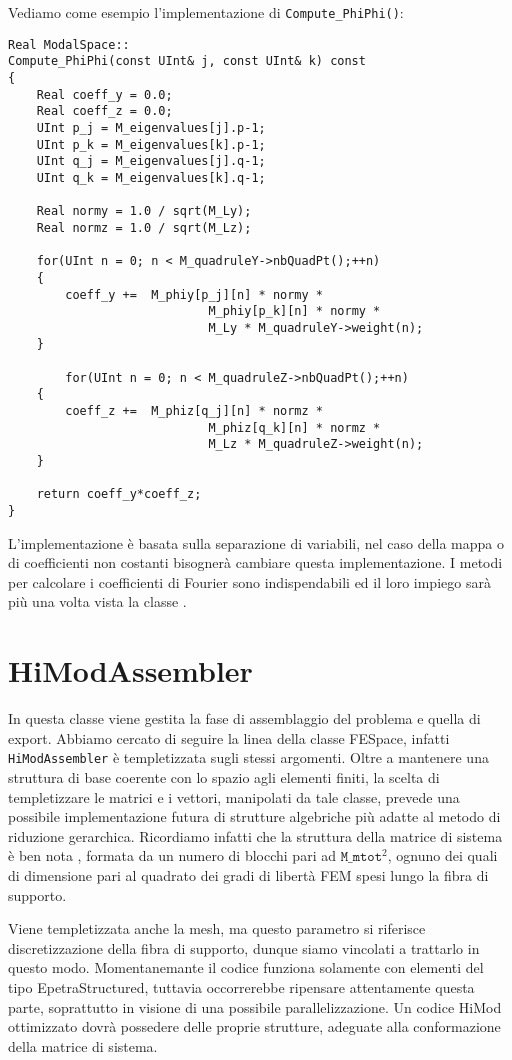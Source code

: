 Vediamo come esempio l'implementazione di \texttt{Compute\_PhiPhi()}:

\begin{lstlisting}[style = general]
Real ModalSpace::
Compute_PhiPhi(const UInt& j, const UInt& k) const
{
	Real coeff_y = 0.0;
	Real coeff_z = 0.0;
	UInt p_j = M_eigenvalues[j].p-1;
	UInt p_k = M_eigenvalues[k].p-1;
	UInt q_j = M_eigenvalues[j].q-1;
	UInt q_k = M_eigenvalues[k].q-1;
	
	Real normy = 1.0 / sqrt(M_Ly);
	Real normz = 1.0 / sqrt(M_Lz);
	
	for(UInt n = 0; n < M_quadruleY->nbQuadPt();++n)
	{
		coeff_y +=	M_phiy[p_j][n] * normy *	
							M_phiy[p_k][n] * normy *
							M_Ly * M_quadruleY->weight(n);
	}
	
		for(UInt n = 0; n < M_quadruleZ->nbQuadPt();++n)
	{
		coeff_z +=	M_phiz[q_j][n] * normz *	
							M_phiz[q_k][n] * normz *
							M_Lz * M_quadruleZ->weight(n);
	}
	
	return coeff_y*coeff_z;
}
\end{lstlisting}
 L'implementazione \`e basata sulla separazione di variabili, nel caso della mappa o di coefficienti non costanti bisogner\`a cambiare
 questa implementazione.
 I metodi per calcolare i coefficienti di Fourier sono indispendabili 
 ed il loro impiego sar\`a pi\`u una volta vista la classe .
 
\section{HiModAssembler}
 
 In questa classe viene gestita la fase di assemblaggio del problema e quella di export. Abbiamo cercato di seguire la linea della classe 
FESpace, infatti \texttt{HiModAssembler} \`e templetizzata sugli stessi argomenti. Oltre a mantenere una struttura di base coerente con lo 
spazio agli elementi finiti, la scelta di templetizzare le matrici e i vettori, manipolati da tale classe, prevede una possibile implementazione 
futura di strutture algebriche pi\`u adatte al metodo di riduzione gerarchica. Ricordiamo infatti che la struttura della matrice di sistema \`e 
ben nota  , formata da un numero di blocchi pari ad $\texttt{M\_mtot}^2$, ognuno dei quali di dimensione pari al quadrato 
dei gradi di libert\`a FEM spesi lungo la fibra di supporto. 
 

 
 Viene templetizzata anche la mesh, ma questo parametro si riferisce discretizzazione della fibra di supporto, dunque siamo vincolati a 
trattarlo in questo modo.
 Momentanemante il codice funziona solamente con elementi del tipo EpetraStructured, tuttavia occorrerebbe ripensare attentamente questa parte, 
soprattutto in visione di una possibile parallelizzazione.
Un codice HiMod ottimizzato dovr\`a possedere delle proprie strutture, adeguate alla conformazione della matrice di sistema.

